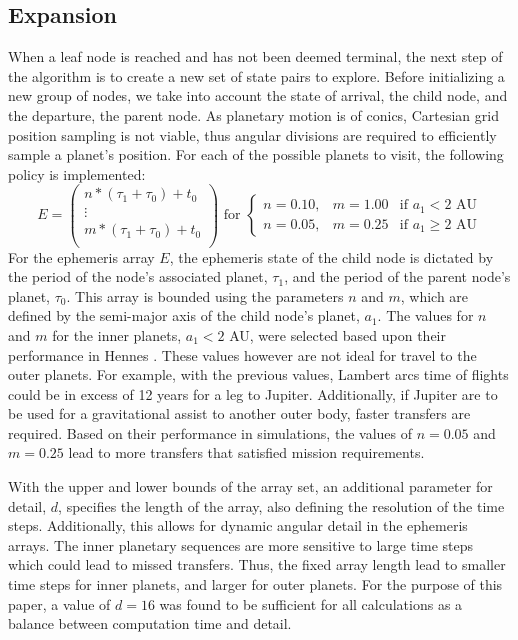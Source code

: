\documentclass[letterpaper, preprint, paper,11pt]{AAS}	%
\begin{document}
\subsection{Expansion}
When a leaf node is reached and has not been deemed terminal, the next step of the algorithm is to create a new set of state pairs to explore. Before initializing a new group of nodes, we take into account the state of arrival, the child node, and the departure, the parent node. As planetary motion is of conics, Cartesian grid position sampling is not viable, thus angular divisions are required to efficiently sample a planet's position. For each of the possible planets to visit, the following policy is implemented:
\begin{equation*}
    \label{eq:ephemArray}
    E =
    \left(\begin{array}{c}
        n*(\tau_1 + \tau_0) + t_0 \\
        \vdots \\
        m*(\tau_1 + \tau_0) + t_0 \\
    \end{array}\right)
    \text{ for }
    \left\{\begin{array}{lll}
        n = 0.10, & m = 1.00 &\text{if } a_1 < 2 \text{ AU} \\
        n = 0.05, & m = 0.25 &\text{if } a_1 \geq 2 \text{ AU}
    \end{array}\right.
\end{equation*}
For the ephemeris array $E$, the ephemeris state of the child node is dictated by the period of the node's associated planet, $\tau_1$, and the period of the parent node's planet, $\tau_0$. This array is bounded using the parameters $n$ and $m$, which are defined by the semi-major axis of the child node's planet, $a_1$. The values for $n$ and $m$ for the inner planets, $a_1 < 2$ AU, were selected based upon their performance in Hennes \cite{Hennes2015}. These values however are not ideal for travel to the outer planets. For example, with the previous values, Lambert arcs time of flights could be in excess of 12 years for a leg to Jupiter. Additionally, if Jupiter are to be used for a gravitational assist to another outer body, faster transfers are required. Based on their performance in simulations, the values of $n = 0.05$ and $m = 0.25$ lead to more transfers that satisfied mission requirements.

With the upper and lower bounds of the array set, an additional parameter for detail, $d$, specifies the length of the array, also defining the resolution of the time steps. Additionally, this allows for dynamic angular detail in the ephemeris arrays. The inner planetary sequences are more sensitive to large time steps which could lead to missed transfers. Thus, the fixed array length lead to smaller time steps for inner planets, and larger for outer planets. For the purpose of this paper, a value of $d = 16$ was found to be sufficient for all calculations as a balance between computation time and detail.
\end{document}
